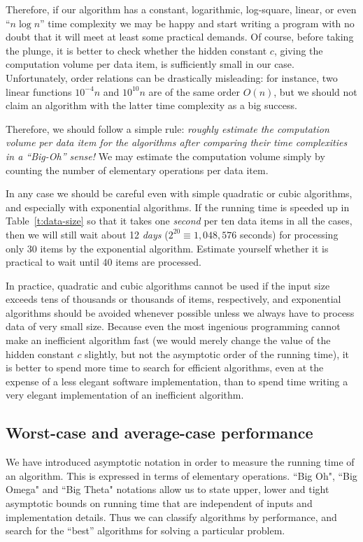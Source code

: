 Therefore, if our algorithm has a constant, logarithmic, log-square, linear, 
or even ``$n \log n$'' time complexity we may be happy and start writing a 
program with no doubt that it will meet at least some practical demands. 
Of course, before taking the plunge, it is better to check whether the hidden 
constant $c$, giving the computation volume per data item, is sufficiently small
in our case. Unfortunately, order relations can be drastically
misleading: for instance, two linear functions $10^{-4}n$ and $10^{10}n$
are of the same order $O(n)$, but we should not claim an
algorithm with the latter time complexity as a big success.

Therefore, we should follow a simple rule: \emph{roughly estimate 
the computation volume per data item for the algorithms after comparing
their time complexities in a ``Big-Oh'' sense!} We may estimate the
computation volume simply by counting the number of elementary
operations per data item.

In any case we should be  careful even with simple
quadratic or cubic algorithms, and especially with exponential
algorithms. If the running time is speeded up in Table~\ref{t:data-size} so that
it takes one \emph{second} per ten data items
in all the cases, then we will still wait about 12 \emph{days}
(\(2^{20}\equiv 1,048,576\) seconds) for processing only 30 items by the 
exponential algorithm. Estimate yourself whether it is
practical to wait until 40 items are processed.
 
In practice, quadratic and cubic algorithms cannot be used if the input
size exceeds tens of thousands or thousands of items, respectively,
and exponential algorithms should be avoided whenever possible unless we
always have to process data of very small size. Because even the most
ingenious programming cannot make an inefficient algorithm fast (we
would merely change the value of the hidden constant $c$ slightly, but
not the asymptotic order of the running time), it is better to spend
more time to search for efficient algorithms, even at the expense of a
less elegant software implementation, than to spend time writing a very
elegant implementation of an inefficient algorithm. 

\subsection{Worst-case and average-case performance}
\label{ss:worst-vs-avg}

We have introduced asymptotic notation in order to measure the running time of 
an algorithm. This is expressed in terms of elementary operations. ``Big Oh", 
``Big Omega" and ``Big Theta" notations allow us to state upper, lower
 and tight asymptotic bounds on running time that are independent of inputs and
implementation details. Thus we can classify algorithms by 
performance, and search for the ``best'' algorithms for solving a particular problem.  

